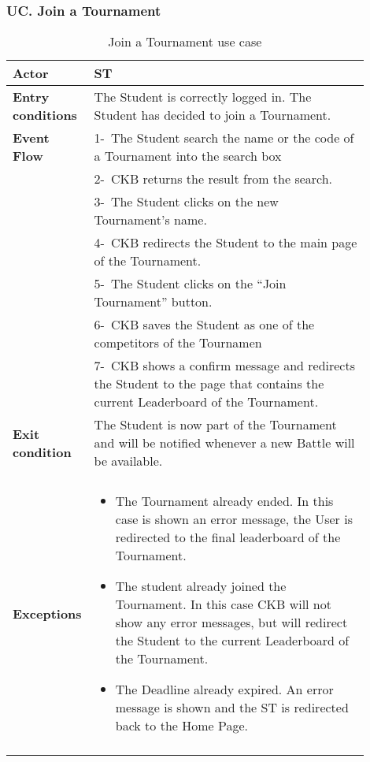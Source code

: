 \subsubsection*{UC\cuc . Join a Tournament}
\begin{center}
    \begin{longtable}{|l|p{0.9\linewidth}|}
        \hline
        \textbf{Actor}            & ST                                                                                                                                                                                        \\
        \hline
        \textbf{Entry conditions} & The Student is correctly logged in. The Student has decided to join a Tournament.                                                                                                                   \\
        \hline
        \textbf{Event Flow}       & 1-\ The Student search the name or the code of a Tournament into the search box \\
        & 2-\ CKB returns the result from the search. \\
        & 3-\ The Student clicks on the new Tournament’s name.        \\
        & 4-\ CKB redirects the Student to the main page of the Tournament. \\
        & 5-\ The Student clicks on the “Join Tournament” button. \\
        & 6-\ CKB saves the Student as one of the competitors of the Tournamen \\
        & 7-\ CKB shows a confirm message and redirects the Student to the page that contains the current Leaderboard of the Tournament. \\
        \hline
        \textbf{Exit condition}   & The Student is now part of the Tournament and will be notified whenever a new Battle will be available.        \\                                                                                                                                                                                \\
        \hline
        \textbf{Exceptions}        & \begin{itemize}
            \item The Tournament already ended. In this case is shown an error message, the User is redirected to the final leaderboard of the Tournament.
            \item The student already joined the Tournament. In this case CKB will not show any error messages, but will redirect the Student to the current Leaderboard of the Tournament.
            \item The Deadline already expired. An error message is shown and the ST is redirected back to the Home Page.
        \end{itemize}    \\
        \hline
        \caption{Join a Tournament use case}
        \label{tab: join_a_Tournament_use_case}
    \end{longtable}
\end{center}

